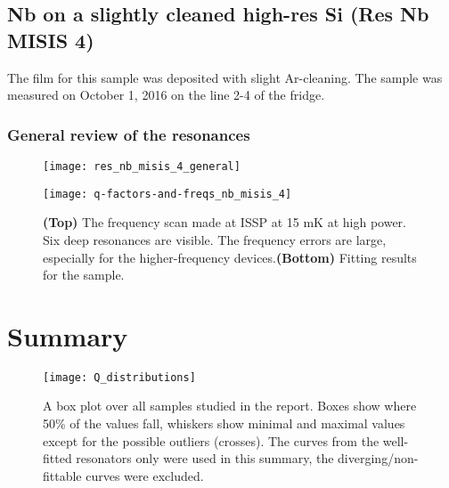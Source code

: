 \documentclass[12pt]{article}
\numberwithin{equation}{section}
\numberwithin{figure}{section}
\begin{document}
\subsection{Nb on a slightly cleaned high-res Si (Res Nb MISIS 4)}

The film for this sample was deposited with slight Ar-cleaning. The sample was measured on October 1, 2016 on the line 2-4 of the fridge.

\subsubsection{General review of the resonances}

\begin{figure}[h!]
\centering
\texttt{[image: res\_nb\_misis\_4\_general]}

\vspace{0.5cm}
\texttt{[image: q-factors-and-freqs\_nb\_misis\_4]}

\caption{\textbf{(Top)} The frequency scan made at ISSP at 15 mK at high power. Six deep resonances are visible. The frequency errors are large, especially for the higher-frequency devices.\textbf{(Bottom)} Fitting results for the sample.}
\end{figure}


\section{Summary}

\begin{figure}[h]
\centering
\texttt{[image: Q\_distributions]}
\caption{A box plot over all samples studied in the report. Boxes show where 50\% of the values fall, whiskers show minimal and maximal values except for the possible outliers (crosses). The curves from the well-fitted resonators only were used in this summary, the diverging/non-fittable curves were excluded.}
\end{figure}
\end{document}
